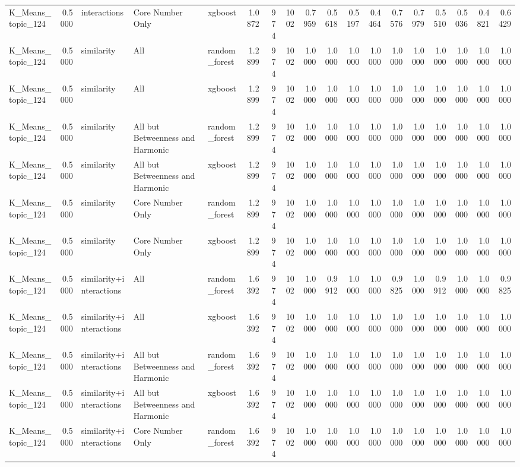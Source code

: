 \begin{tabular}{lrlllrrrrrrrrrrrrr}
K_Means_topic_124 & 0.5000 & interactions & Core Number Only & xgboost & 1.0872 & 974 & 1002 & 0.7959 & 0.5618 & 0.5197 & 0.4464 & 0.7576 & 0.7979 & 0.5510 & 0.5036 & 0.4821 & 0.6429 \\
K_Means_topic_124 & 0.5000 & similarity & All & random_forest & 1.2899 & 974 & 1002 & 1.0000 & 1.0000 & 1.0000 & 1.0000 & 1.0000 & 1.0000 & 1.0000 & 1.0000 & 1.0000 & 1.0000 \\
K_Means_topic_124 & 0.5000 & similarity & All & xgboost & 1.2899 & 974 & 1002 & 1.0000 & 1.0000 & 1.0000 & 1.0000 & 1.0000 & 1.0000 & 1.0000 & 1.0000 & 1.0000 & 1.0000 \\
K_Means_topic_124 & 0.5000 & similarity & All but Betweenness and Harmonic & random_forest & 1.2899 & 974 & 1002 & 1.0000 & 1.0000 & 1.0000 & 1.0000 & 1.0000 & 1.0000 & 1.0000 & 1.0000 & 1.0000 & 1.0000 \\
K_Means_topic_124 & 0.5000 & similarity & All but Betweenness and Harmonic & xgboost & 1.2899 & 974 & 1002 & 1.0000 & 1.0000 & 1.0000 & 1.0000 & 1.0000 & 1.0000 & 1.0000 & 1.0000 & 1.0000 & 1.0000 \\
K_Means_topic_124 & 0.5000 & similarity & Core Number Only & random_forest & 1.2899 & 974 & 1002 & 1.0000 & 1.0000 & 1.0000 & 1.0000 & 1.0000 & 1.0000 & 1.0000 & 1.0000 & 1.0000 & 1.0000 \\
K_Means_topic_124 & 0.5000 & similarity & Core Number Only & xgboost & 1.2899 & 974 & 1002 & 1.0000 & 1.0000 & 1.0000 & 1.0000 & 1.0000 & 1.0000 & 1.0000 & 1.0000 & 1.0000 & 1.0000 \\
K_Means_topic_124 & 0.5000 & similarity+interactions & All & random_forest & 1.6392 & 974 & 1002 & 1.0000 & 0.9912 & 1.0000 & 1.0000 & 0.9825 & 1.0000 & 0.9912 & 1.0000 & 1.0000 & 0.9825 \\
K_Means_topic_124 & 0.5000 & similarity+interactions & All & xgboost & 1.6392 & 974 & 1002 & 1.0000 & 1.0000 & 1.0000 & 1.0000 & 1.0000 & 1.0000 & 1.0000 & 1.0000 & 1.0000 & 1.0000 \\
K_Means_topic_124 & 0.5000 & similarity+interactions & All but Betweenness and Harmonic & random_forest & 1.6392 & 974 & 1002 & 1.0000 & 1.0000 & 1.0000 & 1.0000 & 1.0000 & 1.0000 & 1.0000 & 1.0000 & 1.0000 & 1.0000 \\
K_Means_topic_124 & 0.5000 & similarity+interactions & All but Betweenness and Harmonic & xgboost & 1.6392 & 974 & 1002 & 1.0000 & 1.0000 & 1.0000 & 1.0000 & 1.0000 & 1.0000 & 1.0000 & 1.0000 & 1.0000 & 1.0000 \\
K_Means_topic_124 & 0.5000 & similarity+interactions & Core Number Only & random_forest & 1.6392 & 974 & 1002 & 1.0000 & 1.0000 & 1.0000 & 1.0000 & 1.0000 & 1.0000 & 1.0000 & 1.0000 & 1.0000 & 1.0000 \\

\end{tabular}
